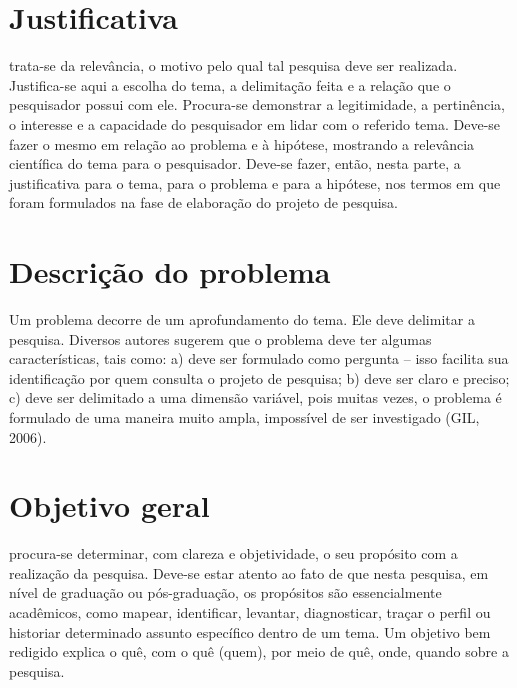     \section{Justificativa}
        
        trata-se da relevância, o motivo pelo qual tal pesquisa deve ser realizada. Justifica-se aqui a escolha do tema, a delimitação feita e a relação que o pesquisador possui com ele. Procura-se demonstrar a legitimidade, a pertinência, o interesse e a capacidade do pesquisador em lidar com o referido tema. Deve-se fazer o mesmo em relação ao problema e à hipótese, mostrando a relevância científica do tema para o pesquisador. Deve-se fazer, então, nesta parte, a justificativa para o tema, para o problema e para a hipótese, nos termos em que foram formulados na fase de elaboração do projeto de pesquisa.
        
    \section{Descrição do problema}
        
        Um problema decorre de um aprofundamento do tema. Ele deve delimitar a pesquisa. Diversos autores sugerem que o problema deve ter algumas características, tais como: a) deve ser formulado como pergunta – isso facilita sua identificação por quem consulta o projeto de pesquisa; b) deve ser claro e preciso; c) deve ser delimitado a uma dimensão variável, pois muitas vezes, o problema é formulado de uma maneira muito ampla, impossível de ser investigado (GIL, 2006).
        
    
    \section{Objetivo geral}

        
        procura-se determinar, com clareza e objetividade, o seu propósito com a realização da pesquisa. Deve-se estar atento ao fato de que nesta pesquisa, em nível de graduação ou pós-graduação, os propósitos são essencialmente acadêmicos, como mapear, identificar, levantar, diagnosticar, traçar o perfil ou historiar determinado assunto específico dentro de um tema. Um objetivo bem redigido explica o quê, com o quê (quem), por meio de quê, onde, quando sobre a pesquisa.
        
